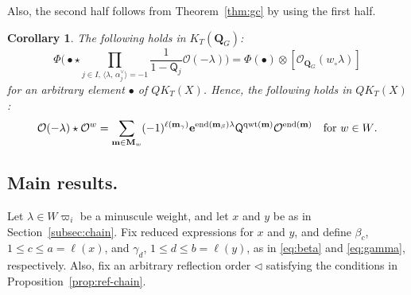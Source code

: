 \documentclass[11pt,a4paper,reqno,dvipdfmx]{amsart}
\numberwithin{equation}{section}
\newcommand{\CO}{\mathcal{O}}
\newcommand{\sQ}{\mathsf{Q}}
\newcommand{\vpi}{\varpi}
\newcommand{\be}{\mathbf{e}}
\newcommand{\bm}{\mathbf{m}}
\newcommand{\bM}{\mathbf{M}}
\DeclareMathOperator{\qwt}{qwt}
\DeclareMathOperator{\ed}{end}
\newcommand{\lng}{w_{\circ}}
\newcommand{\pair}[2]{\langle #1,\,#2 \rangle}
\newcommand{\QG}{\mathbf{Q}_{G}}
\newcommand{\LQG}[1]{[\CO_{\QG}(#1)]}
\theoremstyle{plain}
\newtheorem{cor}[lem]{Corollary}
\theoremstyle{definition}
\theoremstyle{remark}
\begin{document}
Also, the second half follows from Theorem~\ref{thm:gc} by using the first half. 
%
%
\begin{cor} \label{cor:gc2}
The following holds in $K_{T}(\QG)${\rm :}
%
\begin{equation}
\Phi \biggl( \bullet \star 
\prod_{ j \in I,\,
  \pair{\lambda}{\alpha_{j}^{\vee}} = - 1 }
\frac{1}{1-\sQ_{j}} \CO(- \lambda) \biggr) = 
\Phi(\bullet) \otimes \LQG{\lng \lambda} 
\end{equation}
%
for an arbitrary element $\bullet$ of $QK_{T}(X)$. 
Hence, the following holds in $QK_{T}(X)${\rm :}
%
\begin{equation}
\CO(- \lambda) \star \CO^{w} = \sum_{\bm \in \bM_{w}}
  (-1)^{\ell(\bm_{\gamma})} \be^{ \ed(\bm_{\beta}) \lambda }
  \sQ^{\qwt(\bm)} \CO^{ \ed(\bm) } \quad \text{\rm for $w \in W$}. \label{eq:gchev3}
\end{equation}
%
\end{cor}
%
%
\subsection{Main results.}
\label{subsec:main}

Let $\lambda \in W\vpi_{i}$ be a minuscule weight, and let $x$ and $y$ be as 
in Section~\ref{subsec:chain}. Fix reduced expressions for $x$ and $y$, and 
define $\beta_{c}$, $1 \le c \le a = \ell(x)$, and $\gamma_{d}$, $1 \le d \le b=\ell(y)$, 
as in \eqref{eq:beta} and \eqref{eq:gamma}, respectively. 
Also, fix an arbitrary reflection order $\lhd$ satisfying 
the conditions in Proposition~\ref{prop:ref-chain}. 
\end{document}
